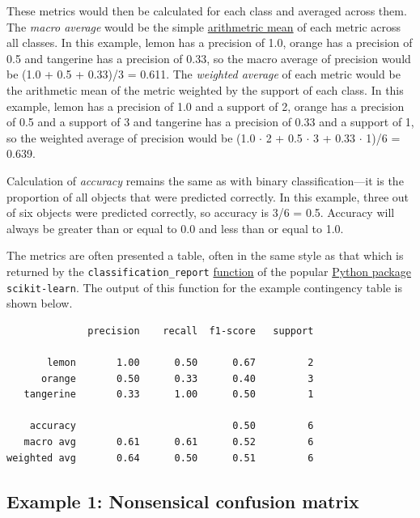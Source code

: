 \documentclass[letterpaper, 12pt]{article}
\begin{document}
These metrics would then be calculated for each class and averaged across them. The \emph{macro average} would be the simple \href{https://en.wikipedia.org/wiki/Arithmetic_mean}{arithmetric mean} of each metric across all classes. In this example, lemon has a precision of 1.0, orange has a precision of 0.5 and tangerine has a precision of 0.33, so the macro average of precision would be (1.0 + 0.5 + 0.33)/3 = 0.611. The \emph{weighted average} of each metric would be the arithmetic mean of the metric weighted by the support of each class. In this example, lemon has a precision of 1.0 and a support of 2, orange has a precision of 0.5 and a support of 3 and tangerine has a precision of 0.33 and a support of 1, so the weighted average of precision would be (1.0 $\cdot$ 2 + 0.5 $\cdot$ 3 + 0.33 $\cdot$ 1)/6 = 0.639.

Calculation of \emph{accuracy} remains the same as with binary classification---it is the proportion of all objects that were predicted correctly. In this example, three out of six objects were predicted correctly, so accuracy is 3/6 = 0.5. Accuracy will always be greater than or equal to 0.0 and less than or equal to 1.0.

The metrics are often presented a table, often in the same style as that which is returned by the \verb|classification_report| \href{https://scikit-learn.org/stable/modules/generated/sklearn.metrics.classification_report.html}{function} of the popular \href{https://scikit-learn.org/stable/index.html}{Python package} \verb|scikit-learn|. The output of this function for the example contingency table is shown below.
\begin{center}
\begin{verbatim}
              precision    recall  f1-score   support

       lemon       1.00      0.50      0.67         2
      orange       0.50      0.33      0.40         3
   tangerine       0.33      1.00      0.50         1

    accuracy                           0.50         6
   macro avg       0.61      0.61      0.52         6
weighted avg       0.64      0.50      0.51         6
\end{verbatim}
\end{center}

\pagebreak

\subsection*{Example 1: Nonsensical confusion matrix}
\end{document}
